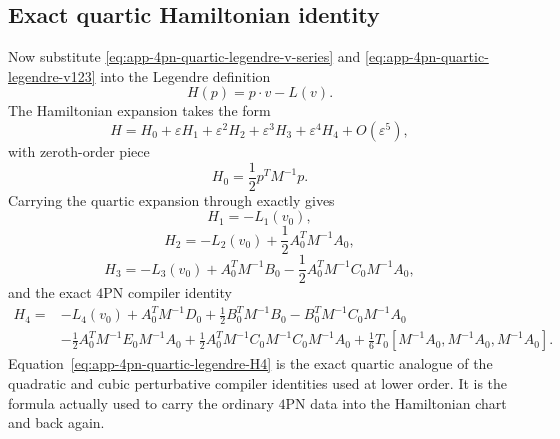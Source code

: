 \documentclass[11pt]{article}
\begin{document}
\subsection{Exact quartic Hamiltonian identity}
\label{app:quartic-legendre-identity}

Now substitute \eqref{eq:app-4pn-quartic-legendre-v-series} and
\eqref{eq:app-4pn-quartic-legendre-v123} into the Legendre definition
\begin{equation}
H(p)=p\cdot v-L(v).
\label{eq:app-4pn-quartic-legendre-H-def}
\end{equation}
The Hamiltonian expansion takes the form
\begin{equation}
H=H_0+\varepsilon H_1+\varepsilon^2H_2+\varepsilon^3H_3+\varepsilon^4H_4+O(\varepsilon^5),
\label{eq:app-4pn-quartic-legendre-H-series}
\end{equation}
with zeroth-order piece
\begin{equation}
H_0=\frac12 p^TM^{-1}p.
\label{eq:app-4pn-quartic-legendre-H0}
\end{equation}
Carrying the quartic expansion through exactly gives
\begin{equation}
H_1=-L_1(v_0),
\label{eq:app-4pn-quartic-legendre-H1}
\end{equation}
\begin{equation}
H_2=-L_2(v_0)+\frac12A_0^TM^{-1}A_0,
\label{eq:app-4pn-quartic-legendre-H2}
\end{equation}
\begin{equation}
H_3=-L_3(v_0)+A_0^TM^{-1}B_0-\frac12A_0^TM^{-1}C_0M^{-1}A_0,
\label{eq:app-4pn-quartic-legendre-H3}
\end{equation}
and the exact $4$PN compiler identity
\begin{equation}
\boxed{
\begin{aligned}
H_4={}&-L_4(v_0)
+A_0^TM^{-1}D_0
+\frac12B_0^TM^{-1}B_0
-B_0^TM^{-1}C_0M^{-1}A_0
\\[0.5ex]
&
-\frac12A_0^TM^{-1}E_0M^{-1}A_0
+\frac12A_0^TM^{-1}C_0M^{-1}C_0M^{-1}A_0
+\frac16T_0[M^{-1}A_0,M^{-1}A_0,M^{-1}A_0].
\end{aligned}
}
\label{eq:app-4pn-quartic-legendre-H4}
\end{equation}
Equation~\eqref{eq:app-4pn-quartic-legendre-H4} is the exact quartic analogue
of the quadratic and cubic perturbative compiler identities used at lower
order.  It is the formula actually used to carry the ordinary $4$PN data into
the Hamiltonian chart and back again.
\end{document}
